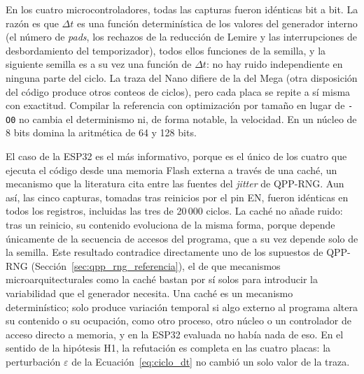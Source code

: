 En los cuatro microcontroladores, todas las capturas fueron idénticas bit a bit. La razón es que $\Delta t$ es una función determinística de los valores del generador interno (el número de \textit{pads}, los rechazos de la reducción de Lemire y las interrupciones de desbordamiento del temporizador), todos ellos funciones de la semilla, y la siguiente semilla es a su vez una función de $\Delta t$: no hay ruido independiente en ninguna parte del ciclo. La traza del Nano difiere de la del Mega (otra disposición del código produce otros conteos de ciclos), pero cada placa se repite a sí misma con exactitud. Compilar la referencia con optimización por tamaño en lugar de \texttt{-O0} no cambia el determinismo ni, de forma notable, la velocidad. En un núcleo de 8 bits domina la aritmética de 64 y 128 bits.

El caso de la ESP32 es el más informativo, porque es el único de los cuatro que ejecuta el código desde una memoria Flash externa a través de una caché, un mecanismo que la literatura cita entre las fuentes del \textit{jitter} de QPP-RNG. Aun así, las cinco capturas, tomadas tras reinicios por el pin EN, fueron idénticas en todos los registros, incluidas las tres de 20\,000 ciclos. La caché no añade ruido: tras un reinicio, su contenido evoluciona de la misma forma, porque depende únicamente de la secuencia de accesos del programa, que a su vez depende solo de la semilla. Este resultado contradice directamente uno de los supuestos de QPP-RNG (Sección~\ref{sec:qpp_rng_referencia}), el de que mecanismos microarquitecturales como la caché bastan por sí solos para introducir la variabilidad que el generador necesita. Una caché es un mecanismo determinístico; solo produce variación temporal si algo externo al programa altera su contenido o su ocupación, como otro proceso, otro núcleo o un controlador de acceso directo a memoria, y en la ESP32 evaluada no había nada de eso. En el sentido de la hipótesis H1, la refutación es completa en las cuatro placas: la perturbación $\varepsilon$ de la Ecuación~\eqref{eq:ciclo_dt} no cambió un solo valor de la traza.

